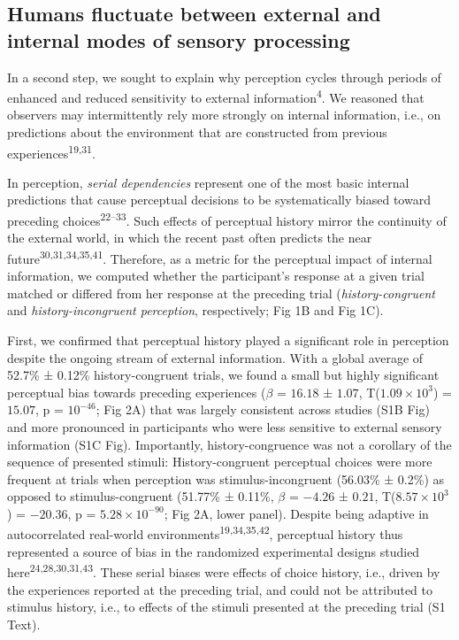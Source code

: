 \documentclass[
]{article}
\begin{document}
\hypertarget{humans-fluctuate-between-external-and-internal-modes-of-sensory-processing}{%
\subsection{Humans fluctuate between external and internal modes of
sensory
processing}\label{humans-fluctuate-between-external-and-internal-modes-of-sensory-processing}}

In a second step, we sought to explain why perception cycles through
periods of enhanced and reduced sensitivity to external
information\textsuperscript{4}. We reasoned that observers may
intermittently rely more strongly on internal information, i.e., on
predictions about the environment that are constructed from previous
experiences\textsuperscript{19,31}.

In perception, \emph{serial dependencies} represent one of the most
basic internal predictions that cause perceptual decisions to be
systematically biased toward preceding choices\textsuperscript{22--33}.
Such effects of perceptual history mirror the continuity of the external
world, in which the recent past often predicts the near
future\textsuperscript{30,31,34,35,41}. Therefore, as a metric for the
perceptual impact of internal information, we computed whether the
participant's response at a given trial matched or differed from her
response at the preceding trial (\emph{history-congruent} and
\emph{history-incongruent perception}, respectively; Fig 1B and Fig 1C).

First, we confirmed that perceptual history played a significant role in
perception despite the ongoing stream of external information. With a
global average of 52.7\% ± 0.12\% history-congruent trials, we found a
small but highly significant perceptual bias towards preceding
experiences (\(\beta\) = \(16.18\) ± \(1.07\),
T(\(\ensuremath{1.09\times 10^{3}}\)) = \(15.07\), p =
\(\ensuremath{10^{-46}}\); Fig 2A) that was largely consistent across
studies (S1B Fig) and more pronounced in participants who
were less sensitive to external sensory information (S1C Fig). Importantly, history-congruence was not a corollary of the sequence
of presented stimuli: History-congruent perceptual choices were more
frequent at trials when perception was stimulus-incongruent (56.03\% ±
0.2\%) as opposed to stimulus-congruent (51.77\% ± 0.11\%, \(\beta\) =
\(-4.26\) ± \(0.21\), T(\(\ensuremath{8.57\times 10^{3}}\)) =
\(-20.36\), p = \(\ensuremath{5.28\times 10^{-90}}\); Fig 2A, lower
panel). Despite being adaptive in autocorrelated real-world
environments\textsuperscript{19,34,35,42}, perceptual history thus
represented a source of bias in the randomized experimental designs
studied here\textsuperscript{24,28,30,31,43}. These serial biases were
effects of choice history, i.e., driven by the experiences reported at
the preceding trial, and could not be attributed to stimulus history,
i.e., to effects of the stimuli presented at the preceding trial
(S1 Text).
\end{document}
